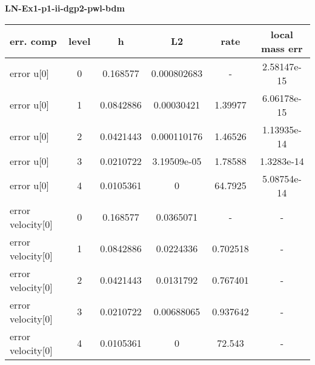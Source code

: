 \documentclass{amsart}
\begin{document}
\begin{center}   
{\bf LN-Ex1-p1-ii-dgp2-pwl-bdm }\end{center}  
\tableofcontents

\begin{table}[h!]
\begin{tabular}{|l|c|c|c|c|c|}
\hline
err. comp & level & h  & L2 & rate  & local mass err \\ 
\hline
error u[0] & 0 & 0.168577  & 0.000802683 & -   &  2.58147e-15 \\ 
error u[0] & 1 & 0.0842886 & 0.00030421  & 1.39977   &  6.06178e-15 \\ 
error u[0] & 2 & 0.0421443 & 0.000110176 & 1.46526   &  1.13935e-14 \\ 
error u[0] & 3 & 0.0210722 & 3.19509e-05 & 1.78588   &  1.3283e-14 \\ 
error u[0] & 4 & 0.0105361 & 0 & 64.7925   &  5.08754e-14 \\ 
error velocity[0] & 0 & 0.168577  & 0.0365071  & -   & - \\ 
error velocity[0] & 1 & 0.0842886 & 0.0224336  & 0.702518   & - \\ 
error velocity[0] & 2 & 0.0421443 & 0.0131792  & 0.767401   & - \\ 
error velocity[0] & 3 & 0.0210722 & 0.00688065 & 0.937642   & - \\ 
error velocity[0] & 4 & 0.0105361 & 0 & 72.543   & - \\ 

\hline
\end{tabular}
\end{table}
\end{document}
